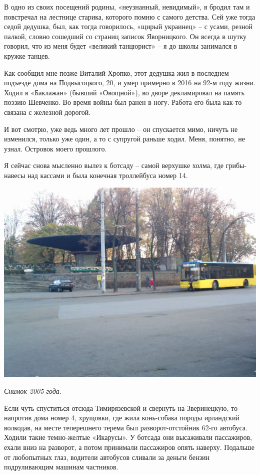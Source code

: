 В одно из своих посещений родины, «неузнанный, невидимый», я бродил там и повстречал на лестнице старика, которого помню с самого детства. Сей уже тогда седой дедушка, был, как тогда говорилось, «щирый украинец» – с усами, резной палкой, словно сошедший со страниц записок Яворницкого. Он всегда в шутку говорил, что из меня будет «великий танцюрист» – я до школы занимался в кружке танцев. 

Как сообщил мне позже Виталий Хропко, этот дедушка жил в последнем подъезде дома на Подвысоцкого, 20, и умер примерно в 2016 на 92-м году жизни. Ходил в «Баклажан» (бывший «Овощной»), во дворе декламировал на память поэзию Шевченко. Во время войны был ранен в ногу. Работа его была как-то связана с железной дорогой.

И вот смотрю, уже ведь много лет прошло – он спускается мимо, ничуть не изменился, только уже один, а то с супругой раньше ходил. Меня, понятно, не узнал. Островок моего прошлого.

Я сейчас снова мысленно вылез к ботсаду – самой верхушке холма, где грибы-навесы над кассами и была конечная троллейбуса номер 14. 

\begin{center}
\includegraphics[width=\linewidth]{chast-vosp/zver/imag0027.jpg}

\textit{Снимок 2005 года.}
\end{center}

Если чуть спуститься отсюда Тимирязевской и свернуть на Зверинецкую, то напротив дома номер 4, хрущовки, где жила конь-собака породы ирландский волкодав, на месте теперешнего терема был разворот-отстойник 62-го автобуса. Ходили такие темно-желтые «Икарусы». У ботсада они высаживали пассажиров, ехали вниз на разворот, а потом принимали пассажиров опять наверху. Подальше от любопытных глаз, водители автобусов сливали за деньги бензин подруливающим машинам частников.

